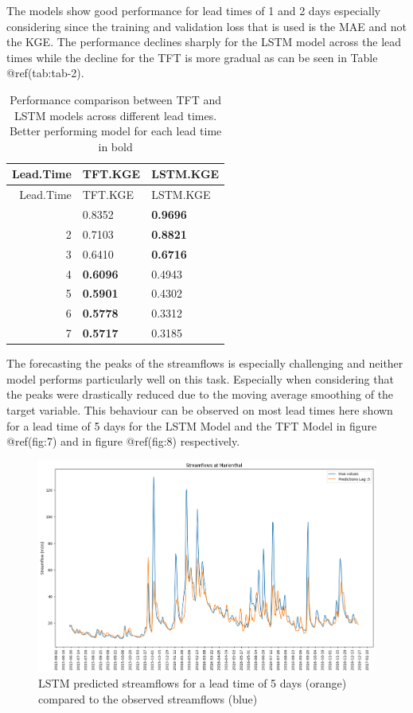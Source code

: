 \documentclass[
]{article}
\begin{document}
The models show good performance for lead times of 1 and 2 days
especially considering since the training and validation loss that is
used is the MAE and not the KGE. The performance declines sharply for
the LSTM model across the lead times while the decline for the TFT is
more gradual as can be seen in Table @ref(tab:tab-2).

\begin{longtable}[]{@{}rll@{}}
\caption{Performance comparison between TFT and LSTM models across
different lead times. Better performing model for each lead time in
bold}\tabularnewline
\toprule\noalign{}
Lead.Time & TFT.KGE & LSTM.KGE \\
\midrule\noalign{}
\endfirsthead
\toprule\noalign{}
Lead.Time & TFT.KGE & LSTM.KGE \\
\midrule\noalign{}
\endhead
\bottomrule\noalign{}
\endlastfoot
1 & 0.8352 & \textbf{0.9696} \\
2 & 0.7103 & \textbf{0.8821} \\
3 & 0.6410 & \textbf{0.6716} \\
4 & \textbf{0.6096} & 0.4943 \\
5 & \textbf{0.5901} & 0.4302 \\
6 & \textbf{0.5778} & 0.3312 \\
7 & \textbf{0.5717} & 0.3185 \\
\end{longtable}

The forecasting the peaks of the streamflows is especially challenging
and neither model performs particularly well on this task. Especially
when considering that the peaks were drastically reduced due to the
moving average smoothing of the target variable. This behaviour can be
observed on most lead times here shown for a lead time of 5 days for the
LSTM Model and the TFT Model in figure @ref(fig:7) and in figure
@ref(fig:8) respectively.

\begin{figure}

{\centering \includegraphics[width=500]{work/07-hydroLSTM/images/lag5_lstm} 

}

\caption{LSTM predicted streamflows for a lead time of 5 days (orange) compared to the observed streamflows (blue)}\label{fig:7}
\end{figure}
\end{document}
